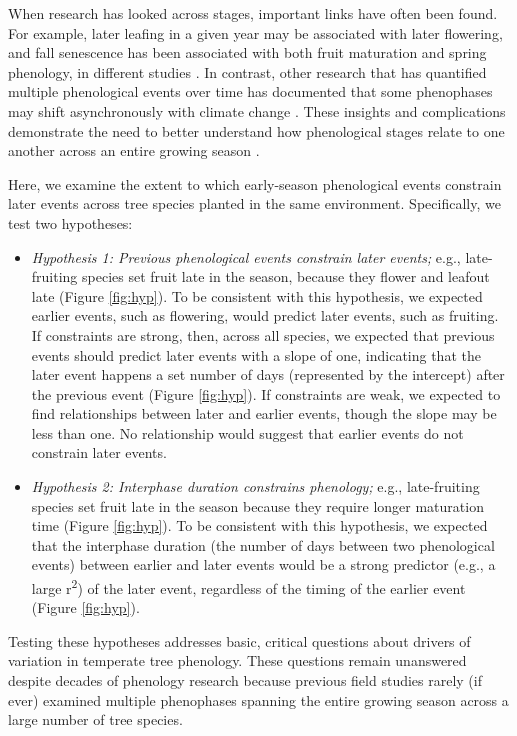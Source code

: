 \documentclass{article}
\begin{document}
\par When research has looked across stages, important links have often been found. For example, later leafing in a given year may be associated with later flowering, and fall senescence has been associated with both fruit maturation and spring phenology, in different studies \citep{lechowicz1995,keenan2015,liu2016}. In contrast, other research that has quantified multiple phenological events over time has documented that some phenophases may shift asynchronously with climate change \citep[e.g., spring events are occurring earlier as fall events have gotten later, first-flower dates have shifted earlier whereas last-flower dates have not,][]{menzel2006,caradonna2014}. These insights and complications demonstrate the need to better understand how phenological stages relate to one another across an entire growing season \citep{wolkovich2014}.

\par Here, we examine the extent to which early-season phenological events constrain later events across tree species planted in the same environment. Specifically, we test two hypotheses:
\begin{itemize}
\item \textit{Hypothesis 1: Previous phenological events constrain later events;} e.g., late-fruiting species set fruit late in the season, because they flower and leafout late (Figure \ref{fig:hyp}). To be consistent with this hypothesis, we expected earlier events, such as flowering, would predict later events, such as fruiting. If constraints are strong, then, across all species, we expected that previous events should predict later events with a slope of one, indicating that the later event happens a set number of days (represented by the intercept) after the previous event (Figure \ref{fig:hyp}). If constraints are weak, we expected to find relationships between later and earlier events, though the slope may be less than one. No relationship would suggest that earlier events do not constrain later events.

\item \textit{Hypothesis 2: Interphase duration constrains phenology;} e.g., late-fruiting species set fruit late in the season because they require longer maturation time (Figure \ref{fig:hyp}). To be consistent with this hypothesis, we expected that the interphase duration (the number of days between two phenological events) between earlier and later events would be a strong predictor (e.g., a large r\textsuperscript{2}) of the later event, regardless of the timing of the earlier event (Figure \ref{fig:hyp}). 
\end{itemize}
Testing these hypotheses addresses basic, critical questions about drivers of variation in temperate tree phenology. These questions remain unanswered despite decades of phenology research because previous field studies rarely (if ever) examined multiple phenophases spanning the entire growing season across a large number of tree species. 
\end{document}
